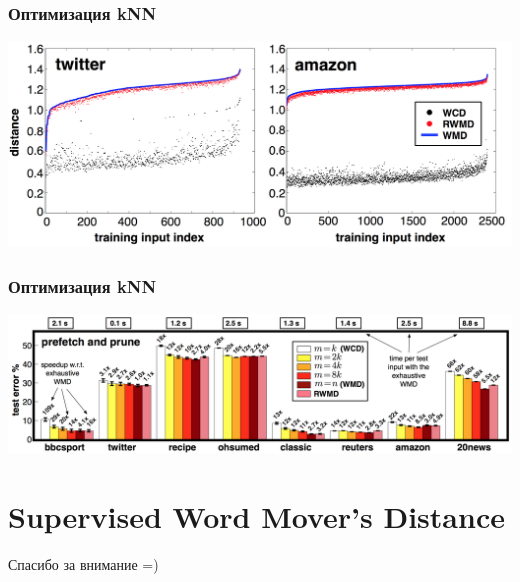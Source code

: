\documentclass{beamer}
\begin{document}
\begin{frame}
\frametitle{Оптимизация kNN}

\includegraphics[width=1 \textwidth]{7.png}

\end{frame}

\begin{frame}
\frametitle{Оптимизация kNN}

\includegraphics[width=1 \textwidth]{8.png}

\end{frame}


\section{Supervised Word Mover's Distance}






\begin{frame}
\Huge{\centerline{Спасибо за внимание =)}}
\end{frame}

\end{document}
